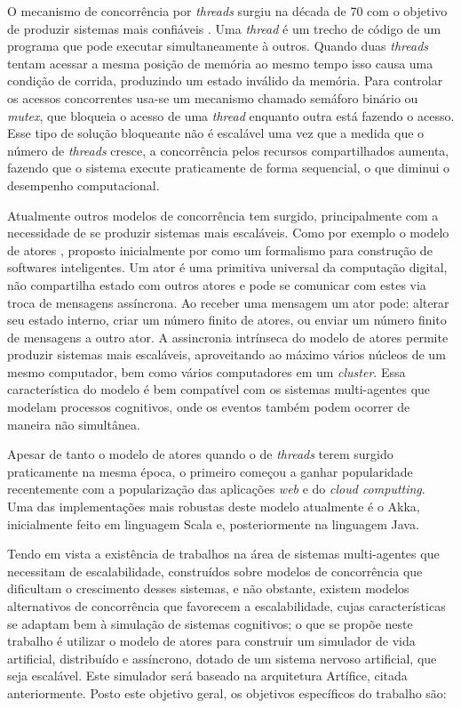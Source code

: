 O mecanismo de concorrência por \textit{threads} surgiu na década de 70 com o objetivo de produzir sistemas mais confiáveis \cite{Hansen2013}. Uma \textit{thread} é um trecho de código de um programa que pode executar simultaneamente à outros. Quando duas \textit{threads} tentam acessar a mesma posição de memória ao mesmo tempo isso causa uma condição de corrida, produzindo um estado inválido da memória. Para controlar os acessos concorrentes usa-se um mecanismo chamado semáforo binário ou \textit{mutex}, que bloqueia o acesso de uma \textit{thread} enquanto outra está fazendo o acesso. Esse tipo de solução bloqueante não é escalável uma vez que a medida que o número de \textit{threads} cresce, a concorrência pelos recursos compartilhados aumenta, fazendo que o sistema execute praticamente de forma sequencial, o que diminui o desempenho computacional.  

Atualmente outros modelos de concorrência tem surgido, principalmente com a necessidade de se produzir sistemas mais escaláveis. Como por exemplo o modelo de atores \cite{Tasharofi2013, Hewitt2010,  Haller2012}, proposto inicialmente por  como um formalismo para construção de softwares inteligentes. Um ator é uma primitiva universal da computação digital, não compartilha estado com outros atores e pode se comunicar com estes via troca de mensagens assíncrona. Ao receber uma mensagem um ator pode: alterar seu estado interno, criar um número finito de atores, ou enviar um número finito de mensagens a outro ator. A assincronia intrínseca do modelo de atores permite produzir sistemas mais escaláveis, aproveitando ao máximo vários núcleos de um mesmo computador, bem como vários computadores em um \textit{cluster}. Essa característica do modelo é bem compatível com os sistemas multi-agentes que modelam processos cognitivos, onde os eventos também podem ocorrer de maneira não simultânea.

Apesar de tanto o modelo de atores quando o de \textit{threads} terem surgido praticamente na mesma época, o primeiro começou a ganhar popularidade recentemente com a popularização das aplicações \textit{web} e do \textit{cloud computting}. Uma das implementações mais robustas deste modelo atualmente é o Akka, inicialmente feito em linguagem Scala e, posteriormente na linguagem Java. 

Tendo em vista a existência de trabalhos na área de sistemas multi-agentes que necessitam de escalabilidade, construídos sobre modelos de concorrência que dificultam o crescimento desses sistemas, e não obstante, existem modelos alternativos de concorrência que favorecem a escalabilidade, cujas características se adaptam bem à simulação de sistemas cognitivos; o que se propõe neste trabalho é utilizar o modelo de atores para construir um simulador de vida artificial, distribuído e assíncrono,  dotado de um sistema nervoso artificial, que seja escalável.  Este simulador será baseado na arquitetura Artífice, citada anteriormente. Posto este objetivo geral, os objetivos específicos do trabalho são:

